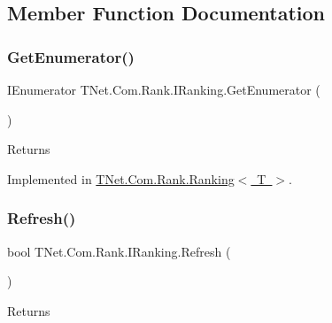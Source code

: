 \subsection{Member Function Documentation}
\mbox{\label{interface_t_net_1_1_com_1_1_rank_1_1_i_ranking_ade93bc13af64d753103e3aa4d94b0d76}} 
\subsubsection{\texorpdfstring{Get\+Enumerator()}{GetEnumerator()}}
{\footnotesize\ttfamily I\+Enumerator T\+Net.\+Com.\+Rank.\+I\+Ranking.\+Get\+Enumerator (\begin{DoxyParamCaption}{ }\end{DoxyParamCaption})}





\begin{DoxyReturn}{Returns}

\end{DoxyReturn}


Implemented in \mbox{\hyperlink{class_t_net_1_1_com_1_1_rank_1_1_ranking_a0e273e472490b5168b2f4af14304c2ea}{T\+Net.\+Com.\+Rank.\+Ranking$<$ T $>$}}.

\mbox{\label{interface_t_net_1_1_com_1_1_rank_1_1_i_ranking_afe72ec8ff768035ea3747fe935e01893}} 
\subsubsection{\texorpdfstring{Refresh()}{Refresh()}}
{\footnotesize\ttfamily bool T\+Net.\+Com.\+Rank.\+I\+Ranking.\+Refresh (\begin{DoxyParamCaption}{ }\end{DoxyParamCaption})}





\begin{DoxyReturn}{Returns}

\end{DoxyReturn}


